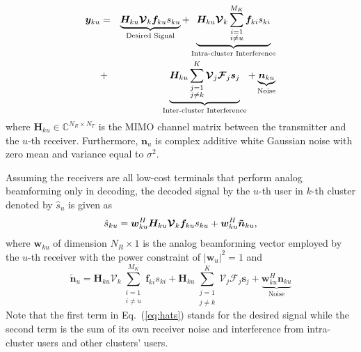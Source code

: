 \documentclass[conference]{IEEEtran}
\begin{document}
\begin{eqnarray}{\label{eq:rewrite}}
{\bm y}_{ku} &=&\underbrace{\bm{H}_{ku} \bm{\mathcal{V}}_k\bm{f}_{ku}{s}_{ku}}_\text{Desired Signal}+\underbrace{\bm{H}_{ku} \bm{\mathcal{V}}_k\sum_{\substack{i=1 \\ i\neq u}}^{M_K}\bm{f}_{ki}s_{ki}}_\text{Intra-cluster Interference} \nonumber\\
&+& \underbrace{\bm{H}_{ku}\sum_{\substack{j=1\\j\neq k}}^{K}\bm{\mathcal{V}}_j\bm{\mathcal{F}}_j\bm{s}_j}_\text{Inter-cluster Interference}+ \underbrace{\bm{n}_{ku}}_\text{Noise}
\end{eqnarray}
where $\bm{H}_{ku}$$\in\mathbb{C}^{N_R\times N_T}$ is the MIMO channel matrix between the transmitter and the $u$-th receiver\cite{el2014spatially}. Furthermore, $\bm{n}_u$ is complex additive white Gaussian noise with zero mean and variance equal to $\sigma^2$.

Assuming the receivers are all low-cost terminals that perform analog beamforming only in decoding, the decoded signal by the $u$-th user in $k$-th cluster denoted by $\hat{s}_u$ is given as
\begin{equation}{\label{eq:hats}}
\hat{s}_{ku} = \bm{w}_{ku}^H \bm{H}_{ku} \bm{\mathcal{V}}_k \bm{f}_{ku} s_{ku} + \bm{w}_{ku}^H \bm{\tilde{n}}_{ku},
\end{equation}
where ${\bm w}_{ku}$ of dimension $N_R\times 1$ is the analog beamforming vector employed by the $u$-th receiver with the power constraint of $|\bm{w}_u|^2=1$ and
\begin{equation}\label{Eq:ntilde}
\bm{\tilde{n}}_u=\bm{H}_{ku} \bm{\mathcal{V}}_k\sum_{\substack{i=1 \\ i\neq u}}^{M_K}\bm{f}_{ki}s_{ki} + \bm{H}_{ku}\sum_{\substack{j=1\\j\neq k}}^{K}\bm{\mathcal{V}}_j\bm{\mathcal{F}}_j\bm{s}_j+  \underbrace{\bm{w}_{ku}^H \bm{n}_{ku}}_\text{Noise}
\end{equation}
Note that the first term in Eq.~(\ref{eq:hats}) stands for the desired signal while the second term is the sum of its own receiver noise and interference from intra-cluster users and other clusters' users.
\end{document}
